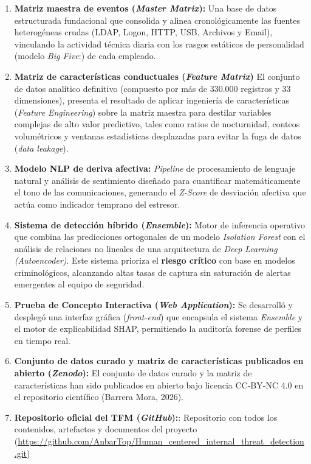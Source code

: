 \documentclass[IB]{TFUOC}%
\begin{document}
\begin{enumerate}
    \item \textbf{Matriz maestra de eventos (\textit{Master Matrix}):}\newline
    Una base de datos estructurada fundacional que consolida y alinea cronológicamente las fuentes heterogéneas crudas (LDAP, Logon, HTTP, USB, Archivos y Email), vinculando la actividad técnica diaria con los rasgos estáticos de personalidad (modelo \textit{Big Five}:) de cada empleado.
    \item \textbf{Matriz de características conductuales (\textit{Feature Matrix})}\newline
    El conjunto de datos analítico definitivo (compuesto por más de 330.000 registros y 33 dimensiones), presenta el resultado de aplicar ingeniería de características (\textit{Feature Engineering}) sobre la matriz maestra para destilar variables complejas de alto valor predictivo, tales como ratios de nocturnidad, conteos volumétricos y ventanas estadísticas desplazadas para evitar la fuga de datos (\textit{data leakage}).
    \item \textbf{Modelo NLP de deriva afectiva:}\newline
    \textit{Pipeline} de procesamiento de lenguaje natural y análisis de sentimiento diseñado para cuantificar matemáticamente el tono de las comunicaciones, generando el \textit{Z-Score} de desviación afectiva que actúa como indicador temprano del estresor.
    \item  \textbf{Sistema de detección híbrido (\textit{Ensemble}):}\newline
    Motor de inferencia operativo que combina las predicciones ortogonales de un modelo \textit{Isolation Forest} con el análisis de relaciones no lineales de una arquitectura de \textit{Deep Learning (Autoencoder)}. Este sistema prioriza el \textbf{riesgo crítico} con base en modelos criminológicos, alcanzando altas tasas de captura sin saturación de alertas emergentes al equipo de seguridad.
    \item  \textbf{Prueba de Concepto Interactiva (\textit{Web Application}):}\newline
    Se desarrolló y desplegó una interfaz gráfica (\textit{front-end}) que encapsula el sistema \textit{Ensemble} y el motor de explicabilidad SHAP, permitiendo la auditoría forense de perfiles en tiempo real.
    \item  \textbf{Conjunto de datos curado y matriz de características publicados en abierto (\textit{Zenodo}):}\newline
    El conjunto de datos curado y la matriz de características han sido publicados en abierto bajo licencia CC-BY-NC 4.0 en el repositorio científico (Barrera Mora, 2026).

    \item  \textbf{Repositorio oficial del TFM (\textit{GitHub}):}:\newline
    Repositorio con todos los contenidos, artefactos y documentos del proyecto (\url{https://github.com/AnbarTop/Human_centered_internal_threat_detection.git})
\end{enumerate}
\end{document}
